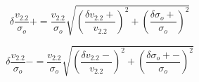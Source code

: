 \documentclass[fleqn,usenatbib]{mn2e}
\begin{document}
\begin{equation}\label{eq:v_over_sig_plus}
   \delta\frac{v_{2.2}}{\sigma_{o}}+ = \frac{v_{2.2}}{\sigma_{o}}\sqrt{\left(\frac{\delta v_{2.2}+}{v_{2.2}}\right)^{2} + \left(\frac{\delta\sigma_{o}+}{\sigma_{o}}\right)^{2}}
\end{equation}

\begin{equation}\label{eq:v_over_sig_minus}
   \delta\frac{v_{2.2}}{\sigma_{o}}- = \frac{v_{2.2}}{\sigma_{o}}\sqrt{\left(\frac{\delta v_{2.2}-}{v_{2.2}}\right)^{2} + \left(\frac{\delta\sigma_{o}+-}{\sigma_{o}}\right)^{2}}
\end{equation}



\bsp    %
\label{lastpage}
\end{document}
